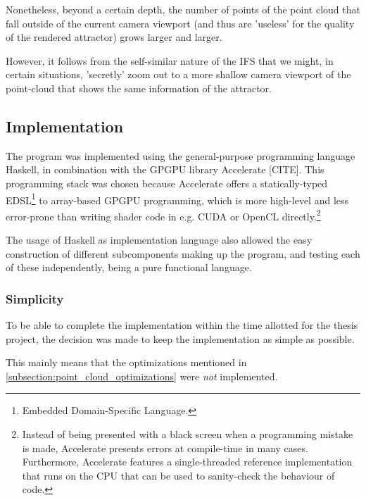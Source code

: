 \documentclass[11pt]{article}
\begin{document}
Nonetheless, beyond a certain depth, the number of points of the point cloud that fall outside of the current camera viewport
(and thus are 'useless' for the quality of the rendered attractor) grows larger and larger.

However, it follows from the self-similar nature of the IFS 
that we might, in certain situations,
'secretly' zoom out to a more shallow camera viewport of the point-cloud that shows the same information of the attractor.


\subsection{Implementation}
\label{sec:org7116b74}


The program was implemented using the general-purpose programming language Haskell, 
in combination with the GPGPU library Accelerate [CITE].
This programming stack was chosen because Accelerate 
offers a statically-typed EDSL\footnote{Embedded Domain-Specific Language.} to array-based GPGPU programming,
which is more high-level and less error-prone than writing shader code in e.g. CUDA or OpenCL directly.\footnote{Instead of being presented with a black screen when a programming mistake is made, 
Accelerate presents errors at compile-time in many cases. Furthermore, Accelerate features a
single-threaded reference implementation that runs on the CPU that can be used to sanity-check the behaviour of code.}

The usage of Haskell as implementation language also allowed 
the easy construction of different subcomponents making up the program,
and testing each of these independently, being a pure functional language.

\subsubsection{Simplicity}
\label{sec:org092d7a6}

To be able to complete the implementation within the time allotted for the thesis project,
the decision was made to keep the implementation as simple as possible.

This mainly means that the optimizations mentioned in \autoref{subsection:point_cloud_optimizations} were \emph{not} implemented.
\end{document}
